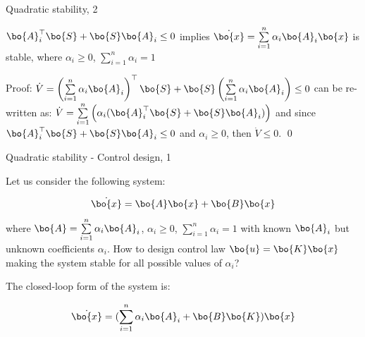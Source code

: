 \documentclass{beamer}
\begin{document}
\begin{frame}{Quadratic stability, 2}
	\begin{flushleft}
		
		\begin{theorem}
			$\bo{A}_i^\top \bo{S} + \bo{S} \bo{A}_i \leq 0$ implies $\dot{\bo{x}}  = \sum\limits_{i=1}^{n} \alpha_i \bo{A}_i \bo{x}$ is stable, where $\alpha_i \geq 0$, $\sum\limits_{i=1}^{n} \alpha_i = 1$
		\end{theorem}
		
		\bigskip
		
		Proof: $\dot V = \left(\sum\limits_{i=1}^{n} \alpha_i \bo{A}_i \right)^\top \bo{S} + \bo{S} 
		\left( \sum\limits_{i=1}^{n} \alpha_i \bo{A}_i \right) \leq 0$ can be re-written as: 
		$\dot V = \sum\limits_{i=1}^{n} \left( \alpha_i (\bo{A}_i^\top \bo{S} + \bo{S} \bo{A}_i) \right) $ and since $\bo{A}_i^\top \bo{S} + \bo{S} \bo{A}_i \leq 0$ and $\alpha_i \geq 0$, then $\dot V \leq 0$. \qed
		
	\end{flushleft}
\end{frame}




\begin{frame}{Quadratic stability - Control design, 1}
	\begin{flushleft}
		
		Let us consider the following system:
		
		\begin{equation}
			\dot{\bo{x}}  = \bo{A}\bo{x} + \bo{B}\bo{x}
		\end{equation}
		where $\bo{A} = \sum\limits_{i=1}^{n} \alpha_i \bo{A}_i$, $\alpha_i \geq 0$, $\sum\limits_{i=1}^{n} \alpha_i = 1$ with known $\bo{A}_i$ but unknown coefficients $\alpha_i$. How to design control law $\bo{u} = \bo{K}\bo{x}$ making the system stable for all possible values of $\alpha_i$? 
		
		\bigskip
		
		The closed-loop form of the system is:
		
		\begin{equation}
			\dot{\bo{x}}  = (\sum\limits_{i=1}^{n} \alpha_i \bo{A}_i + \bo{B}\bo{K})\bo{x}
		\end{equation}
		
		
	\end{flushleft}
\end{frame}
\end{document}
